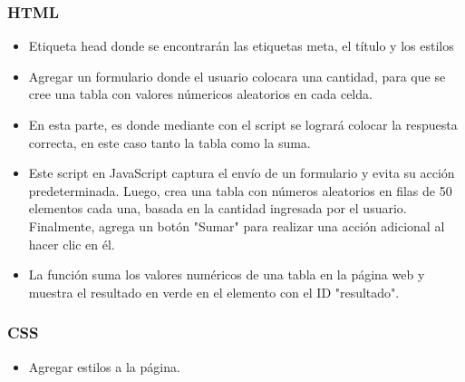 \documentclass{article}
\begin{document}
	\subsubsection{HTML}
	\begin{itemize}
		\item Etiqueta head donde se encontrarán las etiquetas meta, el título y los estilos  
		
		\item Agregar un formulario donde el usuario colocara una cantidad, para que se cree una tabla con valores númericos aleatorios en cada celda.
		
		\item En esta parte, es donde mediante con el script se logrará colocar la respuesta correcta, en este caso tanto la tabla como la suma.
		
		\item Este script en JavaScript captura el envío de un formulario y evita su acción predeterminada. Luego, crea una tabla con números aleatorios en filas de 50 elementos cada una, basada en la cantidad ingresada por el usuario. Finalmente, agrega un botón "Sumar" para realizar una acción adicional al hacer clic en él.
		
		\item La función suma los valores numéricos de una tabla en la página web y muestra el resultado en verde en el elemento con el ID "resultado".
		
	\end{itemize}
	\subsubsection{CSS}
	\begin{itemize}
		\item Agregar estilos a la página.
		
	\end{itemize}
\end{document}
